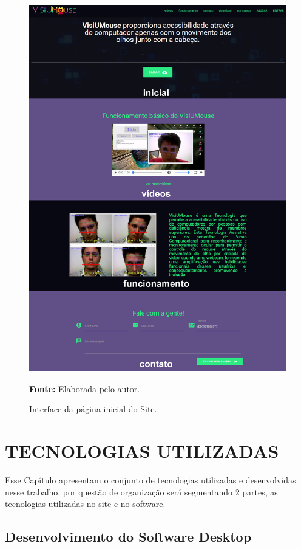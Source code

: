 \begin{figure}[htbp]
\caption{Interface da página inicial do Site.} 
\centering \includegraphics[scale=.33]{img/site.png}

{\fontsize{11}{11}\selectfont \textbf{Fonte:} Elaborada pelo autor.}
\label{fig:site}
\end{figure}

\chapter{TECNOLOGIAS UTILIZADAS}\label{CAP6-tecnilogias-utilizadas}
Esse Capítulo apresentam o conjunto de tecnologias utilizadas e desenvolvidas nesse trabalho, por questão de organização será segmentando 2 partes, as tecnologias utilizadas no site e no software.

\section{Desenvolvimento do Software Desktop}\label{Sub:tecnologias-software}

